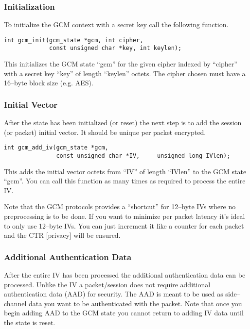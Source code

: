 \documentclass[a4paper]{book}
\begin{document}
\subsubsection{Initialization}
To initialize the GCM context with a secret key call the following function.

\begin{verbatim}
int gcm_init(gcm_state *gcm, int cipher,
             const unsigned char *key, int keylen);
\end{verbatim}
This initializes the GCM state ``gcm'' for the given cipher indexed by ``cipher'' with a secret key ``key'' of length ``keylen'' octets.  The cipher chosen
must have a 16--byte block size (e.g. AES).  

\subsubsection{Initial Vector}
After the state has been initialized (or reset) the next step is to add the session (or packet) initial vector.  It should be unique per packet encrypted.

\begin{verbatim}
int gcm_add_iv(gcm_state *gcm, 
               const unsigned char *IV,     unsigned long IVlen);
\end{verbatim}

This adds the initial vector octets from ``IV'' of length ``IVlen'' to the GCM state ``gcm''.  You can call this function as many times as required
to process the entire IV.  

Note that the GCM protocols provides a ``shortcut'' for 12--byte IVs where no preprocessing is to be done.  If you want to minimize per packet latency it's ideal
to only use 12--byte IVs.  You can just increment it like a counter for each packet and the CTR [privacy] will be ensured.

\subsubsection{Additional Authentication Data}
After the entire IV has been processed the additional authentication data can be processed.  Unlike the IV a packet/session does not require additional
authentication data (AAD) for security.  The AAD is meant to be used as side--channel data you want to be authenticated with the packet.  Note that once
you begin adding AAD to the GCM state you cannot return to adding IV data until the state is reset.
\end{document}
